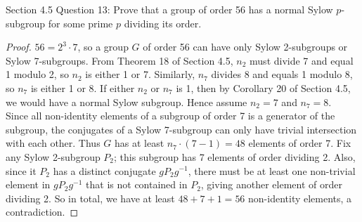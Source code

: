 Section 4.5 Question 13: Prove that a group of order 56 has a normal Sylow
$p$-subgroup for some prime $p$ dividing its order.

\begin{proof}
  $56=2^3\cdot7$, so a group $G$ of order 56 can have only Sylow
  2-subgroups or Sylow 7-subgroups. From Theorem 18 of Section 4.5,
  $n_2$ must divide 7 and equal 1 modulo 2, so $n_2$ is either 1 or 7.
  Similarly, $n_7$ divides 8 and equals 1 modulo 8, so $n_7$ is either 1 or
  8. If either $n_2$ or $n_7$ is 1, then by Corollary 20 of Section 4.5, we
  would have a normal Sylow subgroup. Hence assume $n_2=7$ and $n_7=8$. \\

  Since all non-identity elements of a subgroup of order 7 is a generator of
  the subgroup, the conjugates of a Sylow 7-subgroup can only have trivial
  intersection with each other. Thus $G$ has at least $n_7\cdot(7-1)=48$
  elements of order 7. Fix any Sylow 2-subgroup $P_2$; this subgroup has 7
  elements of order dividing 2. Also, since it $P_2$ has a distinct
  conjugate $gP_2g^{-1}$, there must be at least one non-trivial element
  in $gP_2g^{-1}$ that is not contained in $P_2$, giving another element of
  order dividing 2. So in total, we have at least $48+7+1=56$ non-identity
  elements, a contradiction.
\end{proof}
